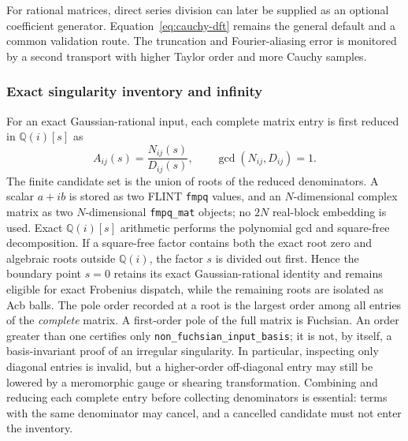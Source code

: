 \documentclass[11pt]{article}
\begin{document}
For rational matrices, direct series division can later be supplied as an optional
coefficient generator.  Equation~\eqref{eq:cauchy-dft} remains the general default and a
common validation route.  The truncation and Fourier-aliasing error is monitored by a second
transport with higher Taylor order and more Cauchy samples.

\subsubsection{Exact singularity inventory and infinity}
\label{subsec:singularity-inventory}

For an exact Gaussian-rational input, each complete matrix entry is first reduced in
$\mathbb Q(i)[s]$ as
\begin{equation}
 A_{ij}(s)=\frac{N_{ij}(s)}{D_{ij}(s)},
 \qquad \gcd(N_{ij},D_{ij})=1.
\end{equation}
The finite candidate set is the union of roots of the reduced denominators.  A scalar
$a+ib$ is stored as two FLINT \texttt{fmpq} values, and an $N$-dimensional complex matrix as
two $N$-dimensional \texttt{fmpq\_mat} objects; no $2N$ real-block embedding is used.  Exact
$\mathbb Q(i)[s]$ arithmetic performs the polynomial gcd and square-free decomposition.  If a
square-free factor contains both the exact root zero and algebraic roots outside
$\mathbb Q(i)$, the factor $s$ is divided out first.  Hence the boundary point $s=0$ retains
its exact Gaussian-rational identity and remains eligible for exact Frobenius dispatch, while
the remaining roots are isolated as Acb balls.  The pole order recorded at a root is
the largest order among all entries of the \emph{complete} matrix.  A first-order pole of the
full matrix is Fuchsian.  An order greater than one certifies only
\texttt{non\_fuchsian\_input\_basis}; it is not, by itself, a basis-invariant proof of an
irregular singularity.  In particular, inspecting only diagonal entries is invalid, but a
higher-order off-diagonal entry may still be lowered by a meromorphic gauge or shearing
transformation.  Combining and reducing each complete entry before collecting denominators
is essential: terms with the same denominator may cancel, and a cancelled candidate must
not enter the inventory.
\end{document}
